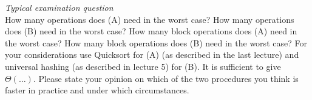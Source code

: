  \textit{Typical examination question}\\
How many operations does (A) need in the worst case?
How many operations does (B) need in the worst case?
How many block operations does (A) need in the worst case?
How many block operations does (B) need in the worst case?
For your considerations use Quicksort for (A)
(as described in the last lecture) and universal hashing
(as described in lecture 5) for (B).
It is sufficient to give $\Theta (\dots)$.
Please state your opinion on which of the two procedures you think is faster in
practice and under which circumstances.
